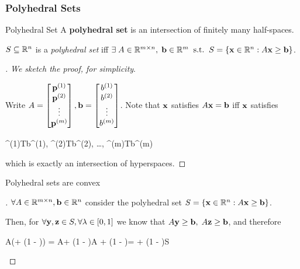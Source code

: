 \subsubsection{Polyhedral Sets}

\begin{defn}{Polyhedral Set}{}
A \textbf{polyhedral set} is an intersection of finitely many half-spaces.
\end{defn}

\begin{prop}{}{}
	$S \subseteq \mathbb{R}^n$ is a \textit{polyhedral set} iff
$\exists \; A \in \mathbb{R}^{m \times n}, \; \mathbf{b} \in \mathbb{R}^m \;\; \text{s.t.} \;\;
S = \{ \mathbf{x} \in \mathbb{R}^n : A\mathbf{x} \geq \mathbf{b} \}$.
\end{prop}

\begin{proof}[]
	\textit{We sketch the proof, for simplicity}.

Write 
$
A = \begin{bmatrix} \mathbf{p}^{(1)} \\ \mathbf{p}^{(2)} \\ \vdots \\ \mathbf{p}^{(m)} \end{bmatrix},
\mathbf{b} = \begin{bmatrix} b^{(1)} \\ b^{(2)} \\ \vdots \\ b^{(m)} \end{bmatrix}
$.
Note that $\mathbf{x}$ satisfies $A\mathbf{x} = \mathbf{b}$ iff $\mathbf{x}$ satisfies
\begin{frml}
	\vp^{(1)T}\vx \geq b^{(1)},
	\vp^{(2)T}\vx \geq b^{(2)}, \ldots, 
	\vp^{(m)T}\vx \geq b^{(m)}
\end{frml}
which is exactly an intersection of hyperspaces.
\end{proof}

\begin{prop}{}{}
Polyhedral sets are convex
\end{prop}

\begin{proof}[]
$\forall A \in \mathbb{R}^{m \times n}, \mathbf{b} \in \mathbb{R}^n$ consider the 
polyhedral set $S = \{ \mathbf{x} \in \mathbb{R}^n : A\mathbf{x} \geq \mathbf{b} \}$. 

Then, for 
$\forall \mathbf{y}, \mathbf{z} \in S, \forall \lambda \in [0, 1]$ we know that
$A\mathbf{y} \geq \mathbf{b}, \; A\mathbf{z} \geq \mathbf{b}$, and therefore 
\begin{frml}
	A(\lambda\vy + (1 - \lambda)\vz) = \lambda A\vy + (1 - \lambda)A\vz
	\geq \lambda \vb + (1 - \lambda)\vb = \vb \implies \lambda \vy + 
	(1 - \lambda)\vz \in S
\end{frml}
\end{proof}

